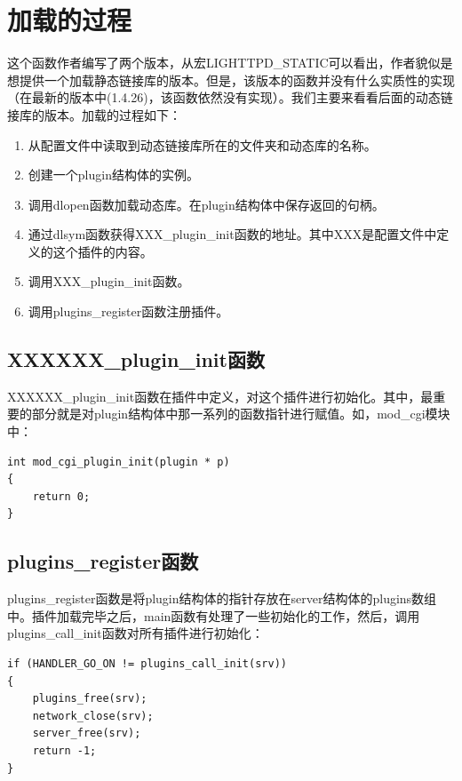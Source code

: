 \documentclass[dvipdfm]{book}
\begin{document}
\section{加载的过程}
这个函数作者编写了两个版本，从宏LIGHTTPD\_STATIC可以看出，作者貌似是想提供一个加载静态链接库的版本。但是，该版本的函数并没有什么实质性的实现（在最新的版本中(1.4.26)，该函数依然没有实现）。我们主要来看看后面的动态链接库的版本。加载的过程如下：
\begin{enumerate}
	\item 从配置文件中读取到动态链接库所在的文件夹和动态库的名称。
	\item 创建一个plugin结构体的实例。
	\item 调用dlopen函数加载动态库。在plugin结构体中保存返回的句柄。
	\item 通过dlsym函数获得XXX\_plugin\_init函数的地址。其中XXX是配置文件中定义的这个插件的内容。
	\item 调用XXX\_plugin\_init函数。
	\item 调用plugins\_register函数注册插件。
\end{enumerate}

\subsection{XXXXXX\_plugin\_init函数}
XXXXXX\_plugin\_init函数在插件中定义，对这个插件进行初始化。其中，最重要的部分就是对plugin结构体中那一系列的函数指针进行赋值。如，mod\_cgi模块中：

\begin{verbatim}
int mod_cgi_plugin_init(plugin * p)
{
	return 0;
}
\end{verbatim}


\subsection{plugins\_register函数}
plugins\_register函数是将plugin结构体的指针存放在server结构体的plugins数组中。插件加载完毕之后，main函数有处理了一些初始化的工作，然后，调用plugins\_call\_init函数对所有插件进行初始化：

\begin{verbatim}
if (HANDLER_GO_ON != plugins_call_init(srv)) 
{
	plugins_free(srv);
	network_close(srv);
	server_free(srv);
	return -1;
}
\end{verbatim}
\end{document}
